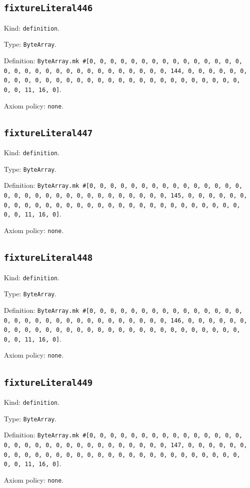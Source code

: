\documentclass[11pt]{article}
\begin{document}
\subsection*{\texttt{fixtureLiteral446}}
\noindent Kind: \texttt{definition}.\par
\noindent Type: \texttt{ByteArray}.\par
\noindent Definition: \texttt{ByteArray.mk \#[0, 0, 0, 0, 0, 0, 0, 0, 0, 0, 0, 0, 0, 0, 0, 0, 0, 0, 0, 0, 0, 0, 0, 0, 0, 0, 0, 0, 0, 0, 0, 144, 0, 0, 0, 0, 0, 0, 0, 0, 0, 0, 0, 0, 0, 0, 0, 0, 0, 0, 0, 0, 0, 0, 0, 0, 0, 0, 0, 0, 0, 0, 0, 11, 16, 0]}.\par
\noindent Axiom policy: \texttt{none}.\par
\subsection*{\texttt{fixtureLiteral447}}
\noindent Kind: \texttt{definition}.\par
\noindent Type: \texttt{ByteArray}.\par
\noindent Definition: \texttt{ByteArray.mk \#[0, 0, 0, 0, 0, 0, 0, 0, 0, 0, 0, 0, 0, 0, 0, 0, 0, 0, 0, 0, 0, 0, 0, 0, 0, 0, 0, 0, 0, 0, 0, 145, 0, 0, 0, 0, 0, 0, 0, 0, 0, 0, 0, 0, 0, 0, 0, 0, 0, 0, 0, 0, 0, 0, 0, 0, 0, 0, 0, 0, 0, 0, 0, 11, 16, 0]}.\par
\noindent Axiom policy: \texttt{none}.\par
\subsection*{\texttt{fixtureLiteral448}}
\noindent Kind: \texttt{definition}.\par
\noindent Type: \texttt{ByteArray}.\par
\noindent Definition: \texttt{ByteArray.mk \#[0, 0, 0, 0, 0, 0, 0, 0, 0, 0, 0, 0, 0, 0, 0, 0, 0, 0, 0, 0, 0, 0, 0, 0, 0, 0, 0, 0, 0, 0, 0, 146, 0, 0, 0, 0, 0, 0, 0, 0, 0, 0, 0, 0, 0, 0, 0, 0, 0, 0, 0, 0, 0, 0, 0, 0, 0, 0, 0, 0, 0, 0, 0, 11, 16, 0]}.\par
\noindent Axiom policy: \texttt{none}.\par
\subsection*{\texttt{fixtureLiteral449}}
\noindent Kind: \texttt{definition}.\par
\noindent Type: \texttt{ByteArray}.\par
\noindent Definition: \texttt{ByteArray.mk \#[0, 0, 0, 0, 0, 0, 0, 0, 0, 0, 0, 0, 0, 0, 0, 0, 0, 0, 0, 0, 0, 0, 0, 0, 0, 0, 0, 0, 0, 0, 0, 147, 0, 0, 0, 0, 0, 0, 0, 0, 0, 0, 0, 0, 0, 0, 0, 0, 0, 0, 0, 0, 0, 0, 0, 0, 0, 0, 0, 0, 0, 0, 0, 11, 16, 0]}.\par
\noindent Axiom policy: \texttt{none}.\par
\end{document}
